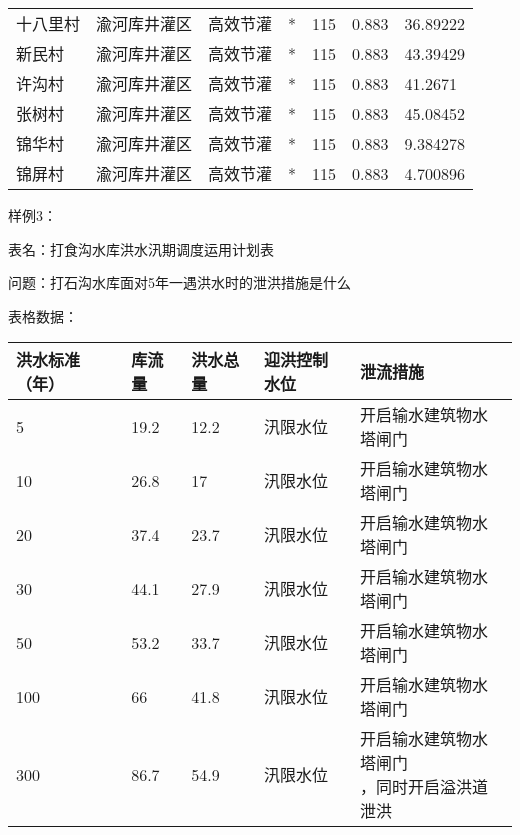 \begin{table}[htbp]
\begin{tabular}{lllllll}
    十八里村 & 渝河库井灌区 & 高效节灌 & * & 115 & 0.883 & 36.89222 \\
    新民村 & 渝河库井灌区 & 高效节灌 & * & 115 & 0.883 & 43.39429 \\
    许沟村 & 渝河库井灌区 & 高效节灌 & * & 115 & 0.883 & 41.2671 \\
    张树村 & 渝河库井灌区 & 高效节灌 & * & 115 & 0.883 & 45.08452 \\
    锦华村 & 渝河库井灌区 & 高效节灌 & * & 115 & 0.883 & 9.384278 \\
    锦屏村 & 渝河库井灌区 & 高效节灌 & * & 115 & 0.883 & 4.700896 \\
    \bottomrule
    \end{tabular}
\end{table}
\newpage
样例3：

表名：打食沟水库洪水汛期调度运用计划表

问题：打石沟水库面对5年一遇洪水时的泄洪措施是什么

表格数据：

\begin{table}[htbp]
    \centering
    \footnotesize
    \begin{tabular}{lllll}
    \toprule
    \textbf{洪水标准（年）} & \textbf{库流量} & \textbf{洪水总量} & \textbf{迎洪控制水位} & \textbf{泄流措施} \\
    \midrule
    5 & 19.2 & 12.2 & 汛限水位 & 开启输水建筑物水塔闸门 \\
    10 & 26.8 & 17 & 汛限水位 & 开启输水建筑物水塔闸门 \\
    20 & 37.4 & 23.7 & 汛限水位 & 开启输水建筑物水塔闸门 \\
    30 & 44.1 & 27.9 & 汛限水位 & 开启输水建筑物水塔闸门 \\
    50 & 53.2 & 33.7 & 汛限水位 & 开启输水建筑物水塔闸门 \\
    100 & 66 & 41.8 & 汛限水位 & 开启输水建筑物水塔闸门 \\
    300 & 86.7 & 54.9 & 汛限水位 & \makecell{开启输水建筑物水塔闸门\\，同时开启溢洪道泄洪} \\
    \bottomrule
    \end{tabular}
    \end{table}